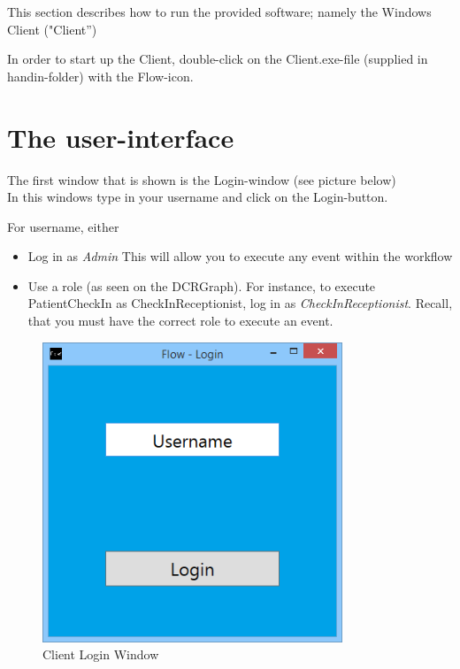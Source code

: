 This section describes how to run the provided software; namely the
Windows Client ("Client'')

In order to start up the Client, double-click on the Client.exe-file
(supplied in handin-folder) with the Flow-icon.

\section{The user-interface}\label{the-user-interface}

The first window that is shown is the Login-window (see picture
below)\\
In this windows type in your username and click on the
Login-button.

For username, either
\begin{itemize}
\item Log in as \textit{Admin} This will allow you to execute any event within the workflow
\item Use a role (as seen on the DCRGraph). For instance, to execute PatientCheckIn as CheckInReceptionist, log in as \textit{CheckInReceptionist}. Recall, that you must have the correct role to execute an event. 
\end{itemize}



\begin{figure}[h]
\centering
\includegraphics[width=0.8\textwidth]{ClientLogin.png}
\caption{Client Login Window}
\end{figure}


